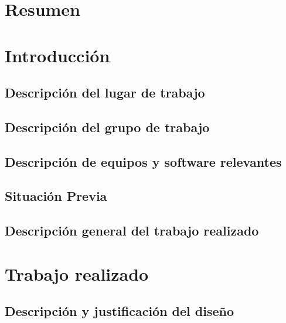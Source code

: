 \documentclass[11pt,titlepage]{article} %
\begin{document}
 
 

\section{Resumen}
\section{Introducción}
	\subsection{Descripción del lugar de trabajo}
	\subsection{Descripción del grupo de trabajo}
	\subsection{Descripción de equipos y software relevantes}
	\subsection{Situación Previa}
	\subsection{Descripción general del trabajo realizado}
\section{Trabajo realizado}
	\subsection{Descripción y justificación del diseño}
\end{document}
